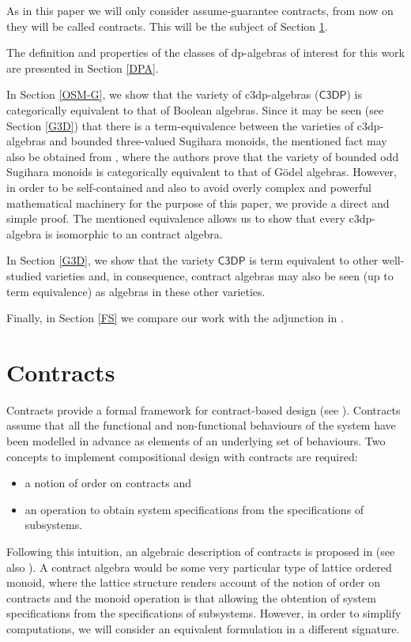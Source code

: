 \documentclass[a4paper,11pt]{article}
\theoremstyle{definition}
\newcommand{\hdz}{\mathsf{C3DP}}
\begin{document}
As in this paper we will only consider assume-guarantee contracts, from now on they will be called contracts.
This will be the subject of Section \ref{AGC}.

The definition and properties of the classes of dp-algebras of interest for this work are presented in Section \ref{DPA}. 

In Section \ref{OSM-G}, we show that the variety of c3dp-algebras ($\hdz$) is categorically equivalent to that of Boolean algebras. 
Since it may be seen (see Section \ref{G3D}) that there is a term-equivalence between the varieties of c3dp-algebras and bounded three-valued Sugihara monoids, the mentioned fact may also be obtained from \cite{GR12}, where the authors prove that the variety of bounded odd Sugihara monoids is categorically equivalent to that of G\"odel algebras. 
However, in order to be self-contained and also to avoid overly complex and powerful mathematical machinery for the purpose of this paper, we provide a direct and simple proof.
The mentioned equivalence allows us to show that every c3dp-algebra is isomorphic to an contract algebra. 

In Section \ref{G3D}, we show that the variety $\hdz$ is term equivalent to other well-studied varieties and, in consequence, contract algebras may also be seen (up to term equivalence) as algebras in these other varieties.

Finally, in Section \ref{FS} we compare our work with the adjunction in \cite{IRp}.


\section{Contracts} \label{AGC}

Contracts provide a formal framework for contract-based design (see \cite{BM}). 
Contracts assume that all the functional and non-functional behaviours of the system have been modelled in advance as elements of an underlying set of behaviours. 
Two concepts to implement compositional design with contracts are required:
\begin{itemize}
\item a notion of order on contracts and
\item an operation to obtain system specifications from the specifications of subsystems.
\end{itemize}

Following this intuition, an algebraic description of contracts is proposed in \cite{IR} (see also \cite{IBV}). 
A contract algebra would be some very particular type of lattice ordered monoid, where the lattice structure renders account of the notion of order on contracts and the monoid operation is that allowing the obtention of system specifications from the specifications of subsystems. 
However, in order to simplify computations, we will consider an equivalent formulation in a different signature.
\end{document}
